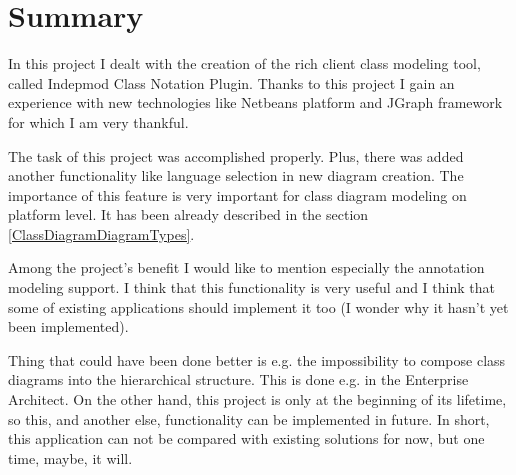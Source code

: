 \section{Summary}

In this project I dealt with the creation of the rich client class modeling tool, called Indepmod Class Notation Plugin. Thanks to this project I gain an experience with new technologies like Netbeans platform and JGraph framework for which I am very thankful. 

The task of this project was accomplished properly. Plus, there was added another functionality like language selection in new diagram creation. The importance of this feature is very important for class diagram modeling on platform level. It has been already described in the section \ref{ClassDiagramDiagramTypes}.

Among the project's benefit I would like to mention especially the annotation modeling support. I think that this functionality is very useful and I think that some of existing applications should implement it too (I wonder why it hasn't yet been implemented).

Thing that could have been done better is e.g. the impossibility to compose class diagrams into the hierarchical structure. This is done e.g. in the Enterprise Architect. On the other hand, this project is only at the beginning of its lifetime, so this, and another else, functionality can be implemented in future. In short, this application can not be compared with existing solutions for now, but one time, maybe, it will.
